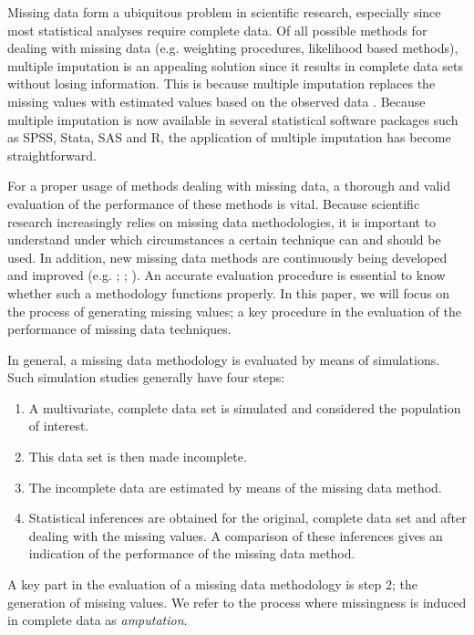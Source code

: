 \documentclass[11pt,a4paper]{article}
\begin{document}
Missing data form a ubiquitous problem in scientific research, especially since most statistical analyses require complete data. Of all possible methods for dealing with missing data (e.g. weighting procedures, likelihood based methods), multiple imputation is an appealing solution since it results in complete data sets without losing information. This is because multiple imputation replaces the missing values with estimated values based on the observed data \citep{Rubin1987, Rubin1996, Stef2012}. Because multiple imputation is now available in several statistical software packages such as SPSS, Stata, SAS and R, the application of multiple imputation has become straightforward. 

For a proper usage of methods dealing with missing data, a thorough and valid evaluation of the performance of these methods is vital. Because scientific research increasingly relies on missing data methodologies, it is important to understand under which circumstances a certain technique can and should be used. In addition, new missing data methods are continuously being developed and improved (e.g. \citealp{Vink2013}; \citealp{Fang2016}; \citealp{Kombo2016}). An accurate evaluation procedure is essential to know whether such a methodology functions properly. In this paper, we will focus on the process of generating missing values; a key procedure in the evaluation of the performance of missing data techniques. 

In general, a missing data methodology is evaluated by means of simulations. Such simulation studies generally have four steps: 

\begin{enumerate} 
\item A multivariate, complete data set is simulated and considered the population of interest. 
\item This data set is then made incomplete. 
\item The incomplete data are estimated by means of the missing data method. 
\item Statistical inferences are obtained for the original, complete data set and after dealing with the missing values. A comparison of these inferences gives an indication of the performance of the missing data method. 
\end{enumerate}

\noindent A key part in the evaluation of a missing data methodology is step 2; the generation of missing values. We refer to the process where missingness is induced in complete data as \textit{amputation}. 
\end{document}
